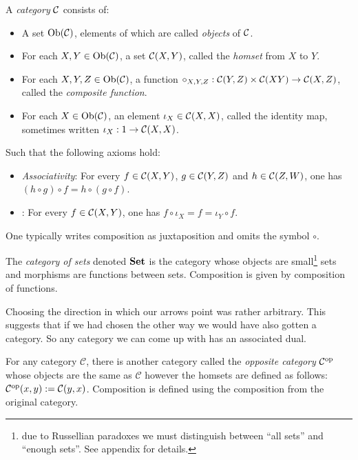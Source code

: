 \begin{defin}
    A \emph{category} $\mathcal{C}$ consists of:
    \begin{itemize}
       \item A set $\text{Ob}(\mathcal{C})$, elements of which are called \textit{objects} of $\mathcal{C}$.
       \item For each $X,Y \in \text{Ob}(\mathcal{C})$, a set $\mathcal{C}(X,Y)$, called the \textit{homset} from $X$ to $Y$.
       \item For each $X, Y, Z\in \text{Ob}(\mathcal{C})$, a function $\circ_{X,Y,Z} : \mathcal{C}(Y, Z) \times \mathcal{C} (X Y) \to \mathcal{C}(X, Z)$, called the \textit{composite function}.
       \item For each $X \in \text{Ob}(\mathcal{C})$, an element $\iota_X \in \mathcal{C}(X,X)$, called the identity map, sometimes written $\iota_X : 1 \to \mathcal{C}(X, X)$.
    \end{itemize}
    Such that the following axioms hold:
    \begin{itemize}
        \item \textit{Associativity}: For every $f \in \mathcal{C}(X,Y)$, $g \in \mathcal{C}(Y,Z)$ and $h \in \mathcal{C}(Z, W)$, one has $(h \circ g ) \circ f = h \circ (g \circ f)$.
        \item {}: For every $f \in \mathcal{C}(X, Y)$, one has $f \circ \iota_X = f = \iota_Y \circ f$.
    \end{itemize}
\end{defin}

\begin{remark}
    One typically writes composition as juxtaposition and omits the symbol $\circ$.
\end{remark}

\begin{example}
	The \emph{category of sets} denoted ${\normalfont\textbf{Set}}$ is the category whose objects are small\footnote{due to Russellian paradoxes we must distinguish between ``all sets'' and ``enough sets''. See appendix for details. } sets and morphisms are functions between sets. Composition is given by composition of functions. 
\end{example}

Choosing the direction in which our arrows point was rather arbitrary. This suggests that if we had chosen the other way we would have also gotten a category. So any category we can come up with has an associated dual.

\begin{example}
	For any category $\mathcal{C}$, there is another category called the \emph{opposite category} $\mathcal{C}^{\text{op}}$ whose objects are the same as $\mathcal{C}$ however the homsets are defined as follows: $\mathcal{C}^{\text{op}}(x,y):=\mathcal{C}(y,x)$. Composition is defined using the composition from the original category.
\end{example}

